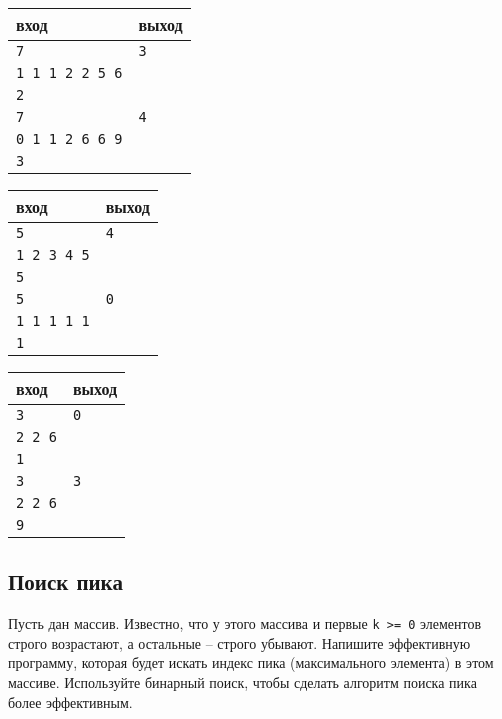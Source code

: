 \documentclass[10pt]{article}
\begin{document}
\begin{multicols}{3}
\begin{center}
\begin{tabular}{ l | l }
 вход & выход \\ \hline
 \texttt{7} & \texttt{3}  \\  
 \texttt{1 1 1 2 2 5 6} & \\
 \texttt{2} & \\ \hline
 \texttt{7} & \texttt{4}  \\  
 \texttt{0 1 1 2 6 6 9} & \\
 \texttt{3} & \\ 
\end{tabular}
\end{center}

\begin{center}
\begin{tabular}{ l | l }
 вход & выход \\ \hline
 \texttt{5} & \texttt{4}  \\  
 \texttt{1 2 3 4 5} & \\
 \texttt{5} & \\ \hline
 \texttt{5} & \texttt{0}  \\  
 \texttt{1 1 1 1 1} & \\
 \texttt{1} & \\
\end{tabular}
\end{center}

\begin{center}
\begin{tabular}{ l | l }
 вход & выход \\ \hline
 \texttt{3} & \texttt{0}  \\  
 \texttt{2 2 6} & \\
 \texttt{1} & \\ \hline
 \texttt{3} & \texttt{3}  \\  
 \texttt{2 2 6} & \\
 \texttt{9} & \\
\end{tabular}
\end{center}
\end{multicols}



\subsection{Поиск пика}
Пусть дан массив. Известно, что у этого массива и первые \texttt{k >= 0} элементов строго возрастают, а остальные -- строго убывают. Напишите эффективную программу, которая будет искать индекс пика (максимального элемента) в этом массиве. Используйте
бинарный поиск, чтобы сделать алгоритм поиска пика более эффективным.
\end{document}
